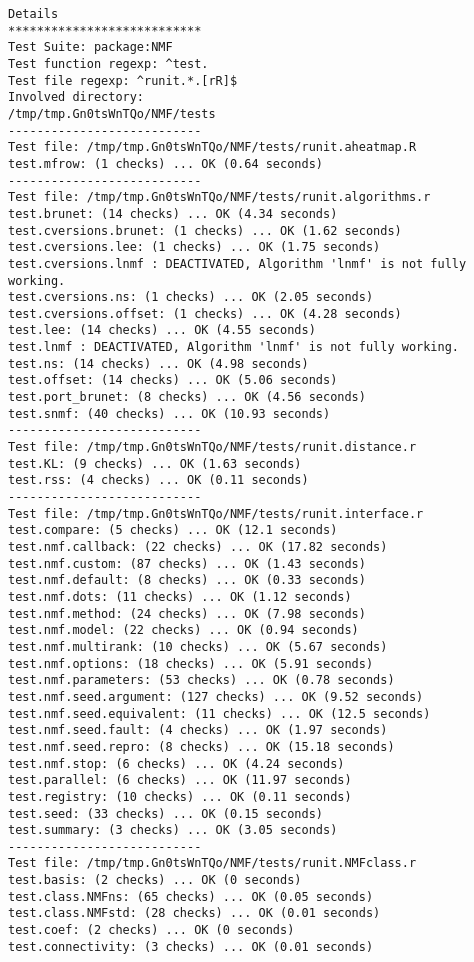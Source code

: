 \documentclass[10pt]{article}
\begin{document}
\begin{verbatim}
Details 
*************************** 
Test Suite: package:NMF 
Test function regexp: ^test. 
Test file regexp: ^runit.*.[rR]$ 
Involved directory: 
/tmp/tmp.Gn0tsWnTQo/NMF/tests 
--------------------------- 
Test file: /tmp/tmp.Gn0tsWnTQo/NMF/tests/runit.aheatmap.R 
test.mfrow: (1 checks) ... OK (0.64 seconds)
--------------------------- 
Test file: /tmp/tmp.Gn0tsWnTQo/NMF/tests/runit.algorithms.r 
test.brunet: (14 checks) ... OK (4.34 seconds)
test.cversions.brunet: (1 checks) ... OK (1.62 seconds)
test.cversions.lee: (1 checks) ... OK (1.75 seconds)
test.cversions.lnmf : DEACTIVATED, Algorithm 'lnmf' is not fully working.
test.cversions.ns: (1 checks) ... OK (2.05 seconds)
test.cversions.offset: (1 checks) ... OK (4.28 seconds)
test.lee: (14 checks) ... OK (4.55 seconds)
test.lnmf : DEACTIVATED, Algorithm 'lnmf' is not fully working.
test.ns: (14 checks) ... OK (4.98 seconds)
test.offset: (14 checks) ... OK (5.06 seconds)
test.port_brunet: (8 checks) ... OK (4.56 seconds)
test.snmf: (40 checks) ... OK (10.93 seconds)
--------------------------- 
Test file: /tmp/tmp.Gn0tsWnTQo/NMF/tests/runit.distance.r 
test.KL: (9 checks) ... OK (1.63 seconds)
test.rss: (4 checks) ... OK (0.11 seconds)
--------------------------- 
Test file: /tmp/tmp.Gn0tsWnTQo/NMF/tests/runit.interface.r 
test.compare: (5 checks) ... OK (12.1 seconds)
test.nmf.callback: (22 checks) ... OK (17.82 seconds)
test.nmf.custom: (87 checks) ... OK (1.43 seconds)
test.nmf.default: (8 checks) ... OK (0.33 seconds)
test.nmf.dots: (11 checks) ... OK (1.12 seconds)
test.nmf.method: (24 checks) ... OK (7.98 seconds)
test.nmf.model: (22 checks) ... OK (0.94 seconds)
test.nmf.multirank: (10 checks) ... OK (5.67 seconds)
test.nmf.options: (18 checks) ... OK (5.91 seconds)
test.nmf.parameters: (53 checks) ... OK (0.78 seconds)
test.nmf.seed.argument: (127 checks) ... OK (9.52 seconds)
test.nmf.seed.equivalent: (11 checks) ... OK (12.5 seconds)
test.nmf.seed.fault: (4 checks) ... OK (1.97 seconds)
test.nmf.seed.repro: (8 checks) ... OK (15.18 seconds)
test.nmf.stop: (6 checks) ... OK (4.24 seconds)
test.parallel: (6 checks) ... OK (11.97 seconds)
test.registry: (10 checks) ... OK (0.11 seconds)
test.seed: (33 checks) ... OK (0.15 seconds)
test.summary: (3 checks) ... OK (3.05 seconds)
--------------------------- 
Test file: /tmp/tmp.Gn0tsWnTQo/NMF/tests/runit.NMFclass.r 
test.basis: (2 checks) ... OK (0 seconds)
test.class.NMFns: (65 checks) ... OK (0.05 seconds)
test.class.NMFstd: (28 checks) ... OK (0.01 seconds)
test.coef: (2 checks) ... OK (0 seconds)
test.connectivity: (3 checks) ... OK (0.01 seconds)

\end{verbatim}
\end{document}
